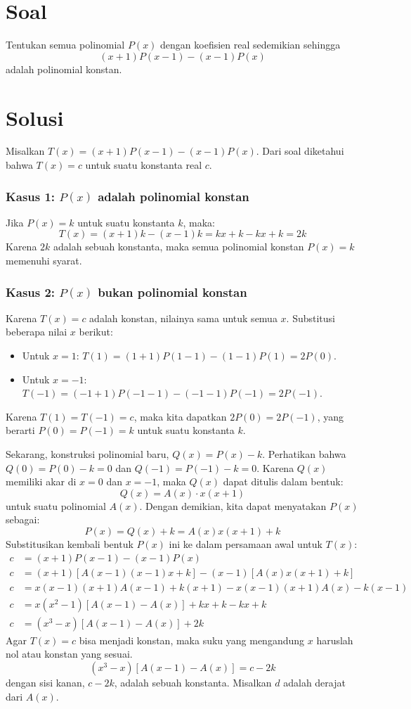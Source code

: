 \section{Soal}
Tentukan semua polinomial $P(x)$ dengan koefisien real sedemikian sehingga
\[ (x+1)P(x-1) - (x-1)P(x) \]
adalah polinomial konstan.

\newpage
\section{Solusi}

Misalkan $T(x) = (x+1)P(x-1) - (x-1)P(x)$. Dari soal diketahui bahwa $T(x)=c$ untuk suatu konstanta real $c$.

\subsubsection*{Kasus 1: $P(x)$ adalah polinomial konstan}
Jika $P(x) = k$ untuk suatu konstanta $k$, maka:
\[ T(x) = (x+1)k - (x-1)k = kx + k - kx + k = 2k \]
Karena $2k$ adalah sebuah konstanta, maka semua polinomial konstan $P(x)=k$ memenuhi syarat.

\subsubsection*{Kasus 2: $P(x)$ bukan polinomial konstan}
Karena $T(x)=c$ adalah konstan, nilainya sama untuk semua $x$. Substitusi beberapa nilai $x$ berikut:
\begin{itemize}
    \item Untuk $x=1$: \quad $T(1) = (1+1)P(1-1) - (1-1)P(1) = 2P(0)$.
    \item Untuk $x=-1$: \quad $T(-1) = (-1+1)P(-1-1) - (-1-1)P(-1) = 2P(-1)$.
\end{itemize}
Karena $T(1) = T(-1) = c$, maka kita dapatkan $2P(0) = 2P(-1)$, yang berarti $P(0) = P(-1) = k$ untuk suatu konstanta $k$.

Sekarang, konstruksi polinomial baru, $Q(x) = P(x) - k$.
Perhatikan bahwa $Q(0) = P(0) - k = 0$ dan $Q(-1) = P(-1) - k = 0$.
Karena $Q(x)$ memiliki akar di $x=0$ dan $x=-1$, maka $Q(x)$ dapat ditulis dalam bentuk:
\[ Q(x) = A(x) \cdot x(x+1) \]
untuk suatu polinomial $A(x)$. Dengan demikian, kita dapat menyatakan $P(x)$ sebagai:
\[ P(x) = Q(x) + k = A(x)x(x+1) + k \]
Substitusikan kembali bentuk $P(x)$ ini ke dalam persamaan awal untuk $T(x)$:
\begin{align*}
    c &= (x+1)P(x-1) - (x-1)P(x) \\
    c &= (x+1)\left[ A(x-1)(x-1)x + k \right] - (x-1)\left[ A(x)x(x+1) + k \right] \\
    c &= x(x-1)(x+1)A(x-1) + k(x+1) - x(x-1)(x+1)A(x) - k(x-1) \\
    c &= x(x^2-1) \left[ A(x-1) - A(x) \right] + kx + k - kx + k \\
    c &= (x^3-x) \left[ A(x-1) - A(x) \right] + 2k
\end{align*}
Agar $T(x)=c$ bisa menjadi konstan, maka suku yang mengandung $x$ haruslah nol atau konstan yang sesuai.
\[ (x^3-x) \left[ A(x-1) - A(x) \right] = c - 2k \]
dengan sisi kanan, $c-2k$, adalah sebuah konstanta. Misalkan $d$ adalah derajat dari $A(x)$.

